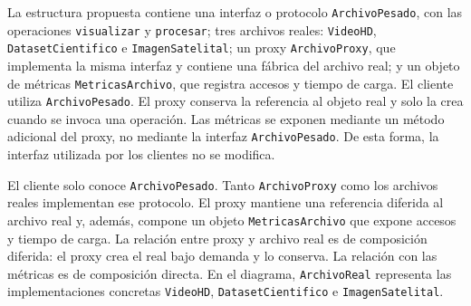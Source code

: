 La estructura propuesta contiene una interfaz o protocolo \texttt{ArchivoPesado}, con las operaciones \texttt{visualizar} y \texttt{procesar}; tres archivos reales: \texttt{VideoHD}, \texttt{DatasetCientifico} e \texttt{ImagenSatelital}; un proxy \texttt{ArchivoProxy}, que implementa la misma interfaz y contiene una fábrica del archivo real; y un objeto de métricas \texttt{MetricasArchivo}, que registra accesos y tiempo de carga. El cliente utiliza \texttt{ArchivoPesado}. El proxy conserva la referencia al objeto real y solo la crea cuando se invoca una operación. Las métricas se exponen mediante un método adicional del proxy, no mediante la interfaz \texttt{ArchivoPesado}. De esta forma, la interfaz utilizada por los clientes no se modifica.

\begin{figure}[H]
\centering
{}
\end{figure}

El cliente solo conoce \texttt{ArchivoPesado}. Tanto \texttt{ArchivoProxy} como los archivos reales implementan ese protocolo. El proxy mantiene una referencia diferida al archivo real y, además, compone un objeto \texttt{MetricasArchivo} que expone accesos y tiempo de carga. La relación entre proxy y archivo real es de composición diferida: el proxy crea el real bajo demanda y lo conserva. La relación con las métricas es de composición directa. En el diagrama, \texttt{ArchivoReal} representa las implementaciones concretas \texttt{VideoHD}, \texttt{DatasetCientifico} e \texttt{ImagenSatelital}.

